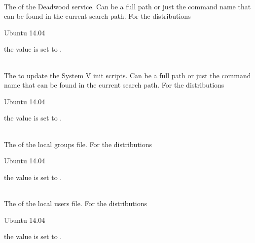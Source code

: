 \\

The  of the Deadwood service. Can be a full path or
just the command name that can be found in the current search path. 
For the distributions
\begin{inparaitem}
\item[\TheDistribution{ubuntu}] Ubuntu 14.04
\end{inparaitem}
the value is set to .

\\

The  to update the System V init scripts. Can be a full path or
just the command name that can be found in the current search path. 
For the distributions
\begin{inparaitem}
\item[\TheDistribution{ubuntu}] Ubuntu 14.04
\end{inparaitem}
the value is set to .

\\

The  of the local groups file.
For the distributions
\begin{inparaitem}
\item[\TheDistribution{ubuntu}] Ubuntu 14.04
\end{inparaitem}
the value is set to .

\\

The  of the local users file.
For the distributions
\begin{inparaitem}
\item[\TheDistribution{ubuntu}] Ubuntu 14.04
\end{inparaitem}
the value is set to .


